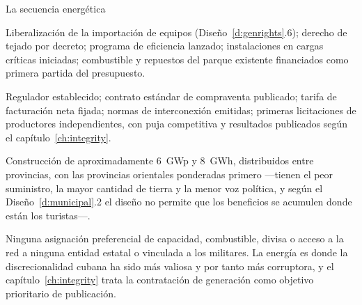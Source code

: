 \begin{design}{La secuencia energética}
\label{d:energyseq}
\begin{rules}
 Liberalización de la importación de equipos (Diseño~\ref{d:genrights}.6);
derecho de tejado por decreto; programa de eficiencia lanzado; instalaciones en cargas
críticas iniciadas; combustible y repuestos del parque existente financiados como primera
partida del presupuesto.

 Regulador establecido; contrato estándar de compraventa publicado;
tarifa de facturación neta fijada; normas de interconexión emitidas; primeras licitaciones
de productores independientes, con puja competitiva y resultados publicados según el
capítulo~\ref{ch:integrity}.

 Construcción de aproximadamente 6~GWp y 8~GWh, distribuidos entre
provincias, con las provincias orientales ponderadas primero ---tienen el peor suministro,
la mayor cantidad de tierra y la menor voz política, y según el Diseño~\ref{d:municipal}.2
el diseño no permite que los beneficios se acumulen donde están los turistas---.

 Ninguna asignación preferencial de capacidad, combustible, divisa
o acceso a la red a ninguna entidad estatal o vinculada a los militares. La energía es
donde la discrecionalidad cubana ha sido más valiosa y por tanto más corruptora, y el
capítulo~\ref{ch:integrity} trata la contratación de generación como objetivo prioritario
de publicación.
\end{rules}
\end{design}
